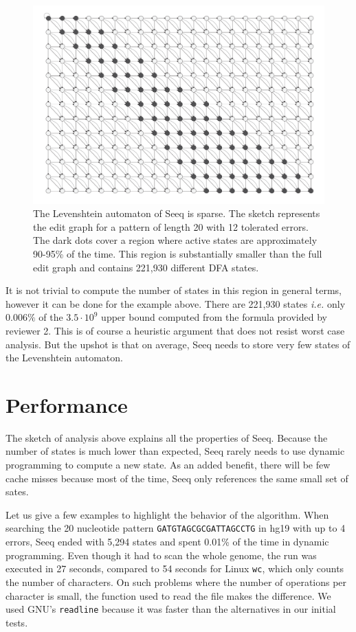 \documentclass[12pt]{article}
\begin{document}
\begin{figure}[!tpb]
\centerline{\includegraphics[scale=0.24]{sparsity_of_the_DFA.pdf}}
\caption{The Levenshtein automaton of Seeq is sparse. The sketch
represents the edit graph for a pattern of length 20 with 12
tolerated errors. The dark dots cover a region where active
states are approximately 90-95\% of the time. This region is
substantially smaller than the full edit graph and contains
221,930 different DFA states.
}\label{sparsity}
\end{figure}

It is not trivial to compute the number of states in this region
in general terms, however it can be done for the example above.
There are 221,930 states \textit{i.e.} only $0.006\%$ of the
$3.5 \cdot 10^9$ upper bound computed from the formula provided by
reviewer 2. This is of course a heuristic argument that does not
resist worst case analysis. But the upshot is that on average,
Seeq needs to store very few states of the Levenshtein automaton.

\section{Performance}

The sketch of analysis above explains all the properties of Seeq.
Because the number of states is much lower than expected, Seeq
rarely needs to use dynamic programming to compute a new state.
As an added benefit, there will be few cache misses because
most of the time, Seeq only references the same small
set of sates.

Let us give a few examples to highlight the behavior of the
algorithm. When searching the 20 nucleotide pattern
\texttt{GATGTAGCGCGATTAGCCTG}
in hg19 with up to 4 errors, Seeq ended with 5,294 states and spent
0.01\% of the time in dynamic programming. Even though
it had to scan the whole genome, the run was executed in 27 seconds,
compared to 54 seconds for Linux \texttt{wc}, which only counts the
number of characters. On such problems where the number of operations
per character is small, the function used to read the file makes
the difference. We used GNU's \texttt{readline} because it was
faster than the alternatives in our initial tests.
\end{document}
